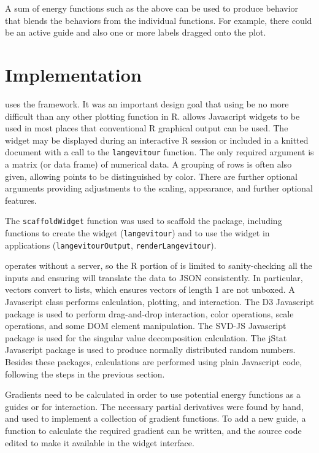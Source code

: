 A sum of energy functions such as the above can be used to produce behavior that blends the behaviors from the individual functions. For example, there could be an active guide and also one or more labels dragged onto the plot.

\hypertarget{implementation}{%
\section{Implementation}\label{implementation}}

 uses the  framework. It was an important design goal that using  be no more difficult than any other plotting function in R.  allows Javascript widgets to be used in most places that conventional R graphical output can be used. The widget may be displayed during an interactive R session or included in a knitted document with a call to the \texttt{langevitour} function. The only required argument is a matrix (or data frame) of numerical data. A grouping of rows is often also given, allowing points to be distinguished by color. There are further optional arguments providing adjustments to the scaling, appearance, and further optional features.

The  \texttt{scaffoldWidget} function was used to scaffold the package, including functions to create the widget (\texttt{langevitour}) and to use the widget in  applications (\texttt{langevitourOutput}, \texttt{renderLangevitour}).

 operates without a server, so the R portion of  is limited to sanity-checking all the inputs and ensuring  will translate the data to JSON consistently. In particular, vectors convert to lists, which ensures vectors of length 1 are not unboxed. A Javascript class performs calculation, plotting, and interaction. The D3 Javascript package is used to perform drag-and-drop interaction, color operations, scale operations, and some DOM element manipulation. The SVD-JS Javascript package is used for the singular value decomposition calculation. The jStat Javascript package is used to produce normally distributed random numbers. Besides these packages, calculations are performed using plain Javascript code, following the steps in the previous section.

Gradients need to be calculated in order to use potential energy functions as a guides or for interaction. The necessary partial derivatives were found by hand, and used to implement a collection of gradient functions. To add a new guide, a function to calculate the required gradient can be written, and the source code edited to make it available in the widget interface.

